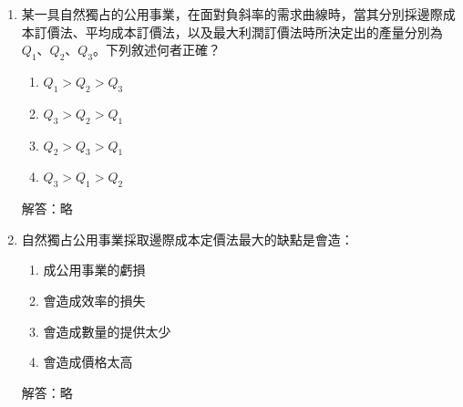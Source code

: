 \documentclass[12pt, a4paper]{article}
\begin{document}
\begin{enumerate}
\begin{itemize}
        \item A（錯誤）： \\
        X-無效率是由經濟學家 Harvey Leibenstein 提出，指的是獨佔或公營事業因為缺乏市場競爭壓力，導致內部管理鬆散、員工怠惰、資源浪費，使得「實際生產成本高於最低可能成本」的現象。這與「產品銷售價格偏低」無關，純粹是內部管理與生產技術上的無效率。

        \item C（錯誤）：\\
        尖峰負荷定價的主要目的是為了解決尖峰與離峰時段需求差異極大，導致產能規劃困難的問題。其目的是為了\textbf{「追求經濟效率（資源的有效配置）」}，讓造成產能緊繃的尖峰使用者負擔產能成本，並藉由價格機制平滑需求，而非單純為了追求利潤最大化。

        \item D（錯誤）： \\
        兩部定價規定變動使用費等於邊際成本（\(P=MC\)），確實可以使產出達到\textbf{「社會分配效率（Allocative efficiency）」}。但是，廠商能否獲得「最大利潤」取決於固定費用（入門費）的設定。若要攫取「最大利潤」，廠商必須實施「第一級差別取價（完全差別取價）」，將所有消費者剩餘剝奪。兩部定價通常只能擷取部分的消費者剩餘（通常以需求最低的消費者剩餘來訂定固定費用），因此不一定能達到利潤最大化；在公營事業中，兩部定價的目的通常只是為了「彌補虧損」以達到損益兩平，而非追求最大利潤。
    \end{itemize}


    \item 某一具自然獨占的公用事業，在面對負斜率的需求曲線時，當其分別採邊際成本訂價法、平均成本訂價法，以及最大利潤訂價法時所決定出的產量分別為 \(Q_1\)、\(Q_2\)、\(Q_3\)。下列敘述何者正確？
    \begin{enumerate}[label=\Alph*.]
        \item \(Q_1 > Q_2 > Q_3\)
        \item \(Q_3 > Q_2 > Q_1\)
        \item \(Q_2 > Q_3 > Q_1\)
        \item \(Q_3 > Q_1 > Q_2\)
    \end{enumerate}
    解答：略

    \item 自然獨占公用事業採取邊際成本定價法最大的缺點是會造：
    \begin{enumerate}[label=\Alph*.]
        \item 成公用事業的虧損
        \item 會造成效率的損失
        \item 會造成數量的提供太少
        \item 會造成價格太高
    \end{enumerate}
    解答：略

\end{enumerate}
\end{document}
